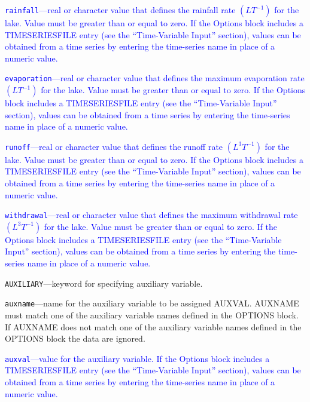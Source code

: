 \begin{description}
\item \textcolor{blue}{\texttt{rainfall}---real or character value that defines the rainfall rate $(LT^{-1})$ for the lake. Value must be greater than or equal to zero. If the Options block includes a TIMESERIESFILE entry (see the ``Time-Variable Input'' section), values can be obtained from a time series by entering the time-series name in place of a numeric value.}

\item \textcolor{blue}{\texttt{evaporation}---real or character value that defines the maximum evaporation rate $(LT^{-1})$ for the lake. Value must be greater than or equal to zero. If the Options block includes a TIMESERIESFILE entry (see the ``Time-Variable Input'' section), values can be obtained from a time series by entering the time-series name in place of a numeric value.}

\item \textcolor{blue}{\texttt{runoff}---real or character value that defines the runoff rate $(L^3 T^{-1})$ for the lake. Value must be greater than or equal to zero. If the Options block includes a TIMESERIESFILE entry (see the ``Time-Variable Input'' section), values can be obtained from a time series by entering the time-series name in place of a numeric value.}

\item \textcolor{blue}{\texttt{withdrawal}---real or character value that defines the maximum withdrawal rate $(L^3 T^{-1})$ for the lake. Value must be greater than or equal to zero. If the Options block includes a TIMESERIESFILE entry (see the ``Time-Variable Input'' section), values can be obtained from a time series by entering the time-series name in place of a numeric value.}

\item \texttt{AUXILIARY}---keyword for specifying auxiliary variable.

\item \texttt{auxname}---name for the auxiliary variable to be assigned AUXVAL.  AUXNAME must match one of the auxiliary variable names defined in the OPTIONS block. If AUXNAME does not match one of the auxiliary variable names defined in the OPTIONS block the data are ignored.

\item \textcolor{blue}{\texttt{auxval}---value for the auxiliary variable. If the Options block includes a TIMESERIESFILE entry (see the ``Time-Variable Input'' section), values can be obtained from a time series by entering the time-series name in place of a numeric value.}


\end{description}
